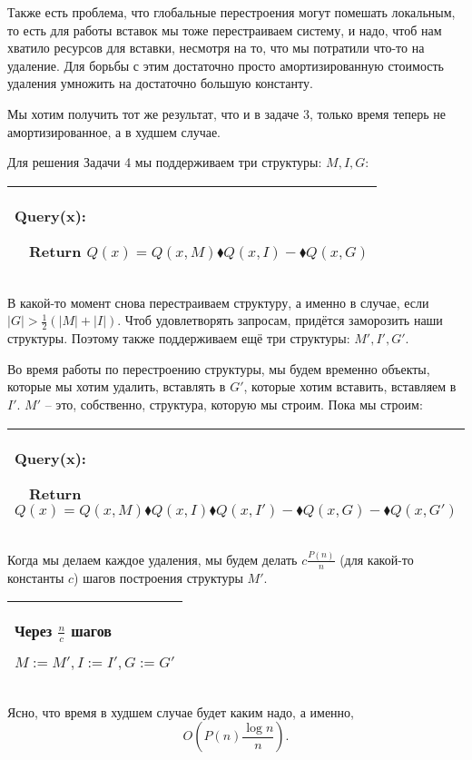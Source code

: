 Также есть проблема, что глобальные перестроения могут помешать локальным, то есть для работы вставок мы тоже перестраиваем систему, и надо, чтоб нам хватило ресурсов для вставки, несмотря на то, что мы потратили что-то на удаление. Для борьбы с этим достаточно просто амортизированную стоимость удаления умножить на достаточно большую константу.


\begin{task}
    Мы хотим получить тот же результат, что и в задаче 3, только время теперь не амортизированное, а в худшем случае.
\end{task}

Для решения Задачи 4 мы поддерживаем три структуры: $M,I,G$:

\begin{tabular}{|p{8cm}|}
    \hline
    Query(x):

    $\quad$Return $Q(x)=Q(x,M)\blacklozenge Q(x,I)-\blacklozenge Q(x,G)$ \\
    \hline
\end{tabular}


В какой-то момент снова перестраиваем структуру, а именно в случае, если $|G|>\frac{1}{2}(|M|+|I|)$. Чтоб удовлетворять запросам, придётся заморозить наши структуры. Поэтому также поддерживаем ещё три структуры: $M',I',G'$.

Во время работы по перестроению структуры, мы будем временно объекты, которые мы хотим удалить, вставлять в $G'$, которые хотим вставить, вставляем в $I'$. $M'$ -- это, собственно, структура, которую мы строим. Пока мы строим:

\begin{tabular}{|p{11cm}|}
    \hline
    Query(x):

    $\quad$Return $Q(x)=Q(x,M)\blacklozenge Q(x,I) \blacklozenge Q(x,I')-\blacklozenge Q(x,G)-\blacklozenge Q(x,G')$ \\
    \hline
\end{tabular}


Когда мы делаем каждое удаления, мы будем делать $c\frac{P(n)}{n}$ (для какой-то константы $c$) шагов построения структуры $M'$.

\begin{tabular}{|p{4cm}|}
    \hline
    Через $\frac{n}{c}$ шагов

    $M:=M',I:=I',G:=G'$ \\
    \hline
\end{tabular}


Ясно, что время в худшем случае будет каким надо, а именно,
\[O\left(P(n)\frac{\log n}{n} \right).\]

